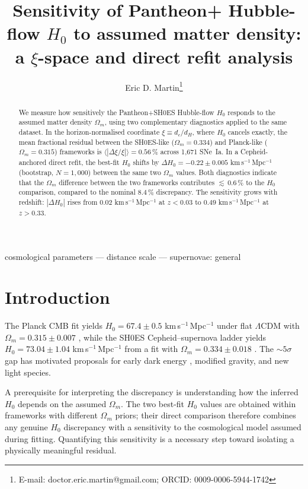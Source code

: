 \documentclass[usenatbib]{mnras}
\title[H$_0$ sensitivity to $\Omega_m$ in Pantheon+]{%
  Sensitivity of Pantheon+ Hubble-flow $H_0$ to assumed matter density:
  a $\xi$-space and direct refit analysis}
\author[E.~D.~Martin]{%
  Eric D. Martin\thanks{E-mail: doctor.eric.martin@gmail.com;
  ORCID: 0009-0006-5944-1742}}
\date{}
\begin{document}
\maketitle

\begin{abstract}
We measure how sensitively the Pantheon+SH0ES Hubble-flow $H_0$ responds
to the assumed matter density $\Omega_m$, using two complementary diagnostics
applied to the same dataset.
In the horizon-normalised coordinate $\xi \equiv d_c/d_H$,
where $H_0$ cancels exactly, the mean fractional residual between the
SH0ES-like ($\Omega_m = 0.334$) and Planck-like ($\Omega_m = 0.315$)
frameworks is $\langle|\Delta\xi/\xi|\rangle = 0.56$\,\%
across 1{,}671 SNe~Ia.
In a Cepheid-anchored direct refit, the best-fit $H_0$ shifts by
$\Delta H_0 = -0.22 \pm 0.005$ km\,s$^{-1}$\,Mpc$^{-1}$
(bootstrap, $N = 1{,}000$) between the same two $\Omega_m$ values.
Both diagnostics indicate that the $\Omega_m$ difference between the two
frameworks contributes ${\lesssim}\,0.6$\,\% to the $H_0$ comparison,
compared to the nominal $8.4$\,\% discrepancy.
The sensitivity grows with redshift: $|\Delta H_0|$ rises from
$0.02$ km\,s$^{-1}$\,Mpc$^{-1}$ at $z < 0.03$ to
$0.49$ km\,s$^{-1}$\,Mpc$^{-1}$ at $z > 0.33$.
\end{abstract}

\begin{keywords}
cosmological parameters --- distance scale --- supernovae: general
\end{keywords}

\section{Introduction}
\label{sec:intro}

The Planck CMB fit yields $H_0 = 67.4 \pm 0.5$ km\,s$^{-1}$\,Mpc$^{-1}$
under flat $\Lambda$CDM with $\Omega_m = 0.315 \pm 0.007$
\citep{planck2020}, while the SH0ES Cepheid--supernova ladder yields
$H_0 = 73.04 \pm 1.04$ km\,s$^{-1}$\,Mpc$^{-1}$ from a fit with
$\Omega_m = 0.334 \pm 0.018$ \citep{riess2022,brout2022}.
The ${\sim}5\sigma$ gap has motivated proposals for early dark energy
\citep{poulin2019}, modified gravity, and new light species.

A prerequisite for interpreting the discrepancy is understanding how the
inferred $H_0$ depends on the assumed $\Omega_m$.
The two best-fit $H_0$ values are obtained within frameworks with
different $\Omega_m$ priors; their direct comparison therefore combines
any genuine $H_0$ discrepancy with a sensitivity to the cosmological
model assumed during fitting.
Quantifying this sensitivity is a necessary step toward isolating a
physically meaningful residual.
\end{document}
